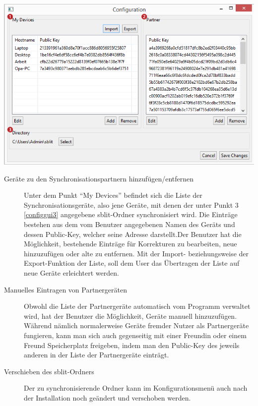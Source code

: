 \includegraphics[]{images/config_gui.png}

\begin{description}

	\item[{Geräte zu den Synchronisationspartnern hinzufügen/entfernen}]
		Unter dem Punkt “My Devices” befindet sich die Liste der
		Synchronisationsgeräte, also jene Geräte, mit denen der unter Punkt 3
		\ref{configgui3} angegebene sblit-Ordner synchronisiert wird. Die Einträge
		bestehen aus dem vom Benutzer angegebenen Namen des Geräts und dessen
		Public-Key, welcher seine Adresse darstellt.Der Benutzer hat die
		Möglichkeit, bestehende Einträge für Korrekturen zu bearbeiten, neue
		hinzuzufügen oder alte zu entfernen. Mit der Import- beziehungsweise der
		Export-Funktion der Liste, soll dem User das Übertragen der Liste auf neue
		Geräte erleichtert werden.

	\item[{Manuelles Eintragen von Partnergeräten}]
		Obwohl die Liste der Partnergeräte automatisch vom Programm verwaltet wird,
		hat der Benutzer die Möglichkeit, Geräte manuell hinzuzufügen. Während
		nämlich normalerweise Geräte fremder Nutzer als Partnergeräte fungieren,
		kann man sich auch gegenseitig mit einer Freundin oder einem Freund
		Speicherplatz freigeben, indem man den Public-Key des jeweils anderen in der
		Liste der Partnergeräte einträgt.

	\item[{Verschieben des sblit-Ordners}]
		Der zu synchronisierende Ordner kann im Konfigurationsmenü auch nach der
		Installation noch geändert und verschoben werden.

\end{description}
